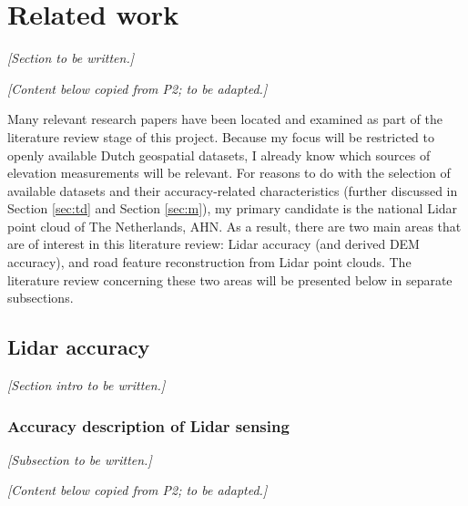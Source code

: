 
\chapter{Related work}
\label{chap:rw}

\textit{[Section to be written.]}

\textit{[Content below copied from P2; to be adapted.]}

Many relevant research papers have been located and examined as part of the literature review stage of this project. Because my focus will be restricted to openly available Dutch geospatial datasets, I already know which sources of elevation measurements will be relevant. For reasons to do with the selection of available datasets and their accuracy-related characteristics (further discussed in Section \ref{sec:td} and Section \ref{sec:m}), my primary candidate is the national Lidar point cloud of The Netherlands, AHN. As a result, there are two main areas that are of interest in this literature review: Lidar accuracy (and derived DEM accuracy), and road feature reconstruction from Lidar point clouds. The literature review concerning these two areas will be presented below in separate subsections.

\section{Lidar accuracy}
\label{sec:lidaraccuracy}

\textit{[Section intro to be written.]}

\subsection{Accuracy description of Lidar sensing}
\label{sub:lidaraccuracy_sensing}

\textit{[Subsection to be written.]}

\textit{[Content below copied from P2; to be adapted.]}

